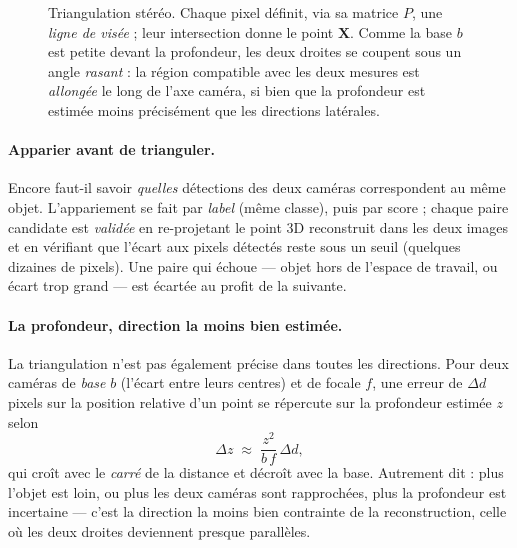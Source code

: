 \begin{figure}[t]
  \centering
  \caption{Triangulation stéréo. Chaque pixel définit, via sa matrice $P$, une \emph{ligne de visée} ; leur intersection donne le point $\mathbf{X}$. Comme la base $b$ est petite devant la profondeur, les deux droites se coupent sous un angle \emph{rasant} : la région compatible avec les deux mesures est \emph{allongée} le long de l'axe caméra, si bien que la profondeur est estimée moins précisément que les directions latérales.}
  \label{fig:triangulation}
\end{figure}

\paragraph{Apparier avant de trianguler.} Encore faut-il savoir \emph{quelles} détections des deux caméras correspondent au même objet. L'appariement se fait par \emph{label} (même classe), puis par score ; chaque paire candidate est \emph{validée} en re-projetant le point 3D reconstruit dans les deux images et en vérifiant que l'écart aux pixels détectés reste sous un seuil (quelques dizaines de pixels). Une paire qui échoue --- objet hors de l'espace de travail, ou écart trop grand --- est écartée au profit de la suivante.

\paragraph{La profondeur, direction la moins bien estimée.} La triangulation n'est pas également précise dans toutes les directions. Pour deux caméras de \emph{base} $b$ (l'écart entre leurs centres) et de focale $f$, une erreur de $\Delta d$ pixels sur la position relative d'un point se répercute sur la profondeur estimée $z$ selon
\[
  \Delta z \;\approx\; \frac{z^{2}}{b\,f}\,\Delta d ,
\]
qui croît avec le \emph{carré} de la distance et décroît avec la base. Autrement dit : plus l'objet est loin, ou plus les deux caméras sont rapprochées, plus la profondeur est incertaine --- c'est la direction la moins bien contrainte de la reconstruction, celle où les deux droites deviennent presque parallèles.

